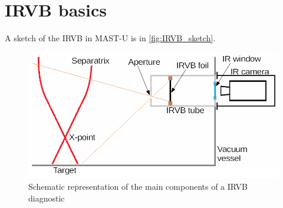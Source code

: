 \section{IRVB basics}

A sketch of the IRVB in MAST-U is in \autoref{fig:IRVB_sketch}.

\begin{figure}[!ht]
	\centering
	\includegraphics[width=0.7\linewidth]{Chapters/chapter2/figs/IRVB cartoon.png}
	\caption{Schematic representation of the main components of a IRVB diagnostic}
	\label{fig:IRVB_sketch}
\end{figure}


